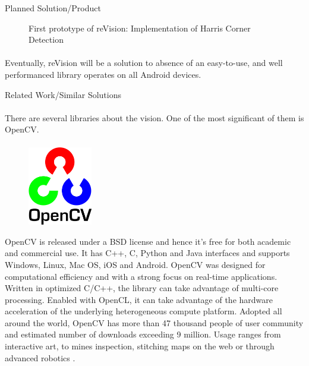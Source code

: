 \documentclass[12pt, a4paper]{article} \pagenumbering{gobble}
\begin{document}
\begin{section}{Planned Solution/Product}
\begin{figure}[h]
    \caption{First prototype of reVision: Implementation of Harris Corner Detection}
    \label{fig:mesh1}
  \end{figure}


  \paragraph{}{
  Eventually, reVision will be a solution to absence of an easy-to-use, and well performanced library operates on
  all Android devices.
  }

\end{section}
\newpage
\begin{section}{Related Work/Similar Solutions}
\paragraph{}{
  There are several libraries about the vision. One of the most significant of them is OpenCV.
}

  \paragraph{}{
  \begin{figure}
    \centering
    \includegraphics[width=0.25\textwidth]{opencv.png}
\end{figure}

OpenCV is released under a BSD license and hence it’s free for
both academic and commercial use. It has C++, C, Python and Java interfaces and supports Windows, Linux, Mac OS,
iOS and Android. OpenCV was designed for computational efficiency and with a strong focus on real-time applications.
Written in optimized C/C++, the library can take advantage of multi-core processing. Enabled with OpenCL, it can
take advantage of the hardware acceleration of the underlying heterogeneous compute platform. Adopted all around
the world, OpenCV has more than 47 thousand people of user community and estimated number of downloads exceeding 9
million. Usage ranges from interactive art, to mines inspection, stitching maps on the web or through advanced
robotics \cite{opencv}.

}
\end{section}
\end{document}
